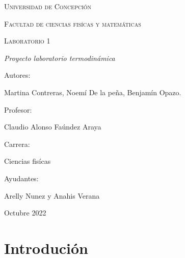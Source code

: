 \documentclass[a4paper, 12p]{article}
\begin{document}
\begin{titlepage}
      \begin{center}     
              
            
            
            
            \vspace{1cm}
            \textsc{{\LARGE Universidad de Concepción}}
            
            \vspace{1cm}
            {\scshape\Large Facultad de ciencias fisícas y matemáticas \par}
            \vspace{2cm}
            {\scshape\Huge Laboratorio 1 \par}
            \vspace{2cm}
            {\itshape\Large Proyecto laboratorio termodinámica \par}
            \vfill
            {\Large Autores: \par}
            {\Large Martina Contreras, Noemí De la peña, Benjamín Opazo. \par}
            \vfill
            \vfill
            {\Large Profesor: \par}
            {\Large Claudio Alonso Faúndez Araya \par}
            \vfill
            \vfill
            {\Large Carrera: \par}
            {\Large Ciencias fisícas \par}
            \vfill
            \vfill
            {\Large Ayudantes: \par}
            {\Large Arelly Nunez y Anahis Verana \par}
            \vfill
            {\Large Octubre 2022 \par}
      \end{center}
\end{titlepage}            

\tableofcontents
\newpage

\section{Introdución}
\end{document}
